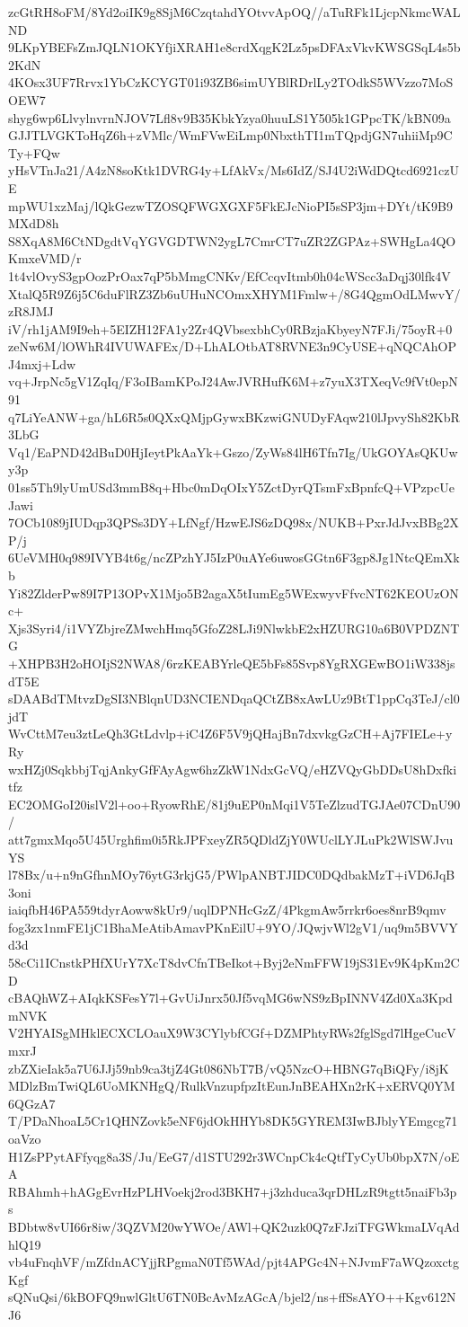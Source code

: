 zcGtRH8oFM/8Yd2oiIK9g8SjM6CzqtahdYOtvvApOQ//aTuRFk1LjcpNkmcWALND
9LKpYBEFsZmJQLN1OKYfjiXRAH1e8crdXqgK2Lz5psDFAxVkvKWSGSqL4s5b2KdN
4KOsx3UF7Rrvx1YbCzKCYGT01i93ZB6simUYBlRDrlLy2TOdkS5WVzzo7MoSOEW7
shyg6wp6LlvylnvrnNJOV7Lfl8v9B35KbkYzya0huuLS1Y505k1GPpcTK/kBN09a
GJJTLVGKToHqZ6h+zVMlc/WmFVwEiLmp0NbxthTI1mTQpdjGN7uhiiMp9CTy+FQw
yHsVTnJa21/A4zN8soKtk1DVRG4y+LfAkVx/Ms6IdZ/SJ4U2iWdDQtcd6921czUE
mpWU1xzMaj/lQkGezwTZOSQFWGXGXF5FkEJcNioPI5sSP3jm+DYt/tK9B9MXdD8h
S8XqA8M6CtNDgdtVqYGVGDTWN2ygL7CmrCT7uZR2ZGPAz+SWHgLa4QOKmxeVMD/r
1t4vlOvyS3gpOozPrOax7qP5bMmgCNKv/EfCcqvItmb0h04cWScc3aDqj30lfk4V
XtalQ5R9Z6j5C6duFlRZ3Zb6uUHuNCOmxXHYM1Fmlw+/8G4QgmOdLMwvY/zR8JMJ
iV/rh1jAM9I9eh+5EIZH12FA1y2Zr4QVbsexbhCy0RBzjaKbyeyN7FJi/75oyR+0
zeNw6M/lOWhR4IVUWAFEx/D+LhALOtbAT8RVNE3n9CyUSE+qNQCAhOPJ4mxj+Ldw
vq+JrpNc5gV1ZqIq/F3oIBamKPoJ24AwJVRHufK6M+z7yuX3TXeqVc9fVt0epN91
q7LiYeANW+ga/hL6R5s0QXxQMjpGywxBKzwiGNUDyFAqw210lJpvySh82KbR3LbG
Vq1/EaPND42dBuD0HjIeytPkAaYk+Gszo/ZyWs84lH6Tfn7Ig/UkGOYAsQKUwy3p
01ss5Th9lyUmUSd3mmB8q+Hbc0mDqOIxY5ZctDyrQTsmFxBpnfcQ+VPzpcUeJawi
7OCb1089jIUDqp3QPSs3DY+LfNgf/HzwEJS6zDQ98x/NUKB+PxrJdJvxBBg2XP/j
6UeVMH0q989IVYB4t6g/ncZPzhYJ5IzP0uAYe6uwosGGtn6F3gp8Jg1NtcQEmXkb
Yi82ZlderPw89I7P13OPvX1Mjo5B2agaX5tIumEg5WExwyvFfvcNT62KEOUzONc+
Xjs3Syri4/i1VYZbjreZMwchHmq5GfoZ28LJi9NlwkbE2xHZURG10a6B0VPDZNTG
+XHPB3H2oHOIjS2NWA8/6rzKEABYrleQE5bFs85Svp8YgRXGEwBO1iW338jsdT5E
sDAABdTMtvzDgSI3NBlqnUD3NCIENDqaQCtZB8xAwLUz9BtT1ppCq3TeJ/cl0jdT
WvCttM7eu3ztLeQh3GtLdvlp+iC4Z6F5V9jQHajBn7dxvkgGzCH+Aj7FIELe+yRy
wxHZj0SqkbbjTqjAnkyGfFAyAgw6hzZkW1NdxGcVQ/eHZVQyGbDDsU8hDxfkitfz
EC2OMGoI20islV2l+oo+RyowRhE/81j9uEP0nMqi1V5TeZlzudTGJAe07CDnU90/
att7gmxMqo5U45Urghfim0i5RkJPFxeyZR5QDldZjY0WUclLYJLuPk2WlSWJvuYS
l78Bx/u+n9nGfhnMOy76ytG3rkjG5/PWlpANBTJIDC0DQdbakMzT+iVD6JqB3oni
iaiqfbH46PA559tdyrAoww8kUr9/uqlDPNHcGzZ/4PkgmAw5rrkr6oes8nrB9qmv
fog3zx1nmFE1jC1BhaMeAtibAmavPKnEilU+9YO/JQwjvWl2gV1/uq9m5BVVYd3d
58cCi1ICnstkPHfXUrY7XcT8dvCfnTBeIkot+Byj2eNmFFW19jS31Ev9K4pKm2CD
cBAQhWZ+AIqkKSFesY7l+GvUiJnrx50Jf5vqMG6wNS9zBpINNV4Zd0Xa3KpdmNVK
V2HYAISgMHklECXCLOauX9W3CYlybfCGf+DZMPhtyRWs2fglSgd7lHgeCucVmxrJ
zbZXieIak5a7U6JJj59nb9ca3tjZ4Gt086NbT7B/vQ5NzcO+HBNG7qBiQFy/i8jK
MDlzBmTwiQL6UoMKNHgQ/RulkVnzupfpzItEunJnBEAHXn2rK+xERVQ0YM6QGzA7
T/PDaNhoaL5Cr1QHNZovk5eNF6jdOkHHYb8DK5GYREM3IwBJblyYEmgcg71oaVzo
H1ZsPPytAFfyqg8a3S/Ju/EeG7/d1STU292r3WCnpCk4cQtfTyCyUb0bpX7N/oEA
RBAhmh+hAGgEvrHzPLHVoekj2rod3BKH7+j3zhduca3qrDHLzR9tgtt5naiFb3ps
BDbtw8vUI66r8iw/3QZVM20wYWOe/AWl+QK2uzk0Q7zFJziTFGWkmaLVqAdhlQ19
vb4uFnqhVF/mZfdnACYjjRPgmaN0Tf5WAd/pjt4APGc4N+NJvmF7aWQzoxctgKgf
sQNuQsi/6kBOFQ9nwlGltU6TN0BcAvMzAGcA/bjel2/ns+ffSsAYO++Kgv612NJ6
